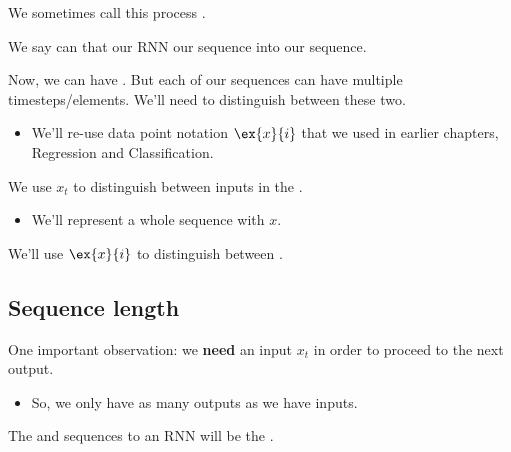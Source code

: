         We sometimes call this process .\\

        \begin{definition}
            We say can that our RNN  our  sequence into our  sequence.
        \end{definition}

        Now, we can have . But each of our sequences can have multiple timesteps/elements. We'll need to distinguish between these two.

        \begin{itemize}
            \item We'll re-use data point notation $\ex{x}{i}$ that we used in earlier chapters, Regression and Classification.\\
        \end{itemize}
            

        \begin{notation}
            We use $x_t$ to distinguish between inputs in the .

            \begin{itemize}
                \item We'll represent a whole sequence with $x$.
            \end{itemize}

            We'll use $\ex{x}{i}$ to distinguish between .
        \end{notation}

    \subsection{Sequence length}
    
        One important observation: we \textbf{need} an input $x_t$ in order to proceed to the next output.

        \begin{itemize}
            \item So, we only have as many outputs as we have inputs.\\
        \end{itemize}

        \begin{concept}
            The  and  sequences to an RNN will be the .
        \end{concept}

